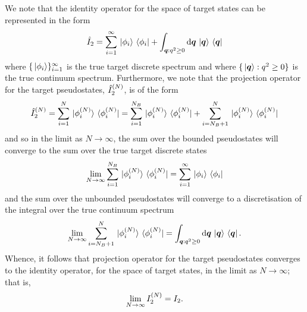 \documentclass[draft]{article}
\begin{document}
We note that the identity operator for the space of target states can be
represented in the form
\begin{equation}
  \label{eq:target-identity}
  \hat{I}_{2}
  =
  \sum_{i = 1}^{\infty}
  \ket*{\phi_{i}}
  \bra*{\phi_{i}}
  +
  \int_{\boldsymbol{q} : q^{2} \geq 0}
  \dd{\boldsymbol{q}}
  \ket*{\boldsymbol{q}}
  \bra*{\boldsymbol{q}}
\end{equation}
where $\lbrace\ket*{\phi_{i}}\rbrace_{i = 1}^{\infty}$ is the true target discrete
spectrum and where $\lbrace\ket*{\boldsymbol{q}} : q^{2} \geq 0\rbrace$ is the true
continuum spectrum.
Furthermore, we note that the projection operator for the target pseudostates,
$\hat{I}_{2}^{(N)}$, is of the form
\begin{equation}
  \label{eq:target-projection}
  \hat{I}_{2}^{(N)}
  =
  \sum_{i = 1}^{N}
  \ket*{\phi_{i}^{(N)}}
  \bra*{\phi_{i}^{(N)}}
  =
  \sum_{i = 1}^{N_{B}}
  \ket*{\phi_{i}^{(N)}}
  \bra*{\phi_{i}^{(N)}}
  +
  \sum_{i = N_{B} + 1}^{N}
  \ket*{\phi_{i}^{(N)}}
  \bra*{\phi_{i}^{(N)}}
\end{equation}
and so in the limit as $N \to \infty$, the sum over the bounded pseudostates
will converge to the sum over the true target discrete states
\begin{equation}
  \label{eq:target-projection-discrete}
  \lim_{N \to \infty}
  \sum_{i = 1}^{N_{B}}
  \ket*{\phi_{i}^{(N)}}
  \bra*{\phi_{i}^{(N)}}
  =
  \sum_{i = 1}^{\infty}
  \ket*{\phi_{i}}
  \bra*{\phi_{i}}
\end{equation}
and the sum over the unbounded pseudostates will converge to a discretisation of
the integral over the true continuum spectrum
\begin{equation}
  \label{eq:target-projection-continuum}
  \lim_{N \to \infty}
  \sum_{i = N_{B} + 1}^{N}
  \ket*{\phi_{i}^{(N)}}
  \bra*{\phi_{i}^{(N)}}
  =
  \int_{\boldsymbol{q} : q^{2} \geq 0}
  \dd{\boldsymbol{q}}
  \ket*{\boldsymbol{q}}
  \bra*{\boldsymbol{q}}
  .
\end{equation}
Whence, it follows that projection operator for the target pseudostates
converges to the identity operator, for the space of target states,
in the limit as $N \to \infty$; that is,
\begin{equation}
  \label{eq:target-projection-convergence}
  \lim_{N \to \infty}
  I_{2}^{(N)}
  =
  I_{2}
  .
\end{equation}
\end{document}
